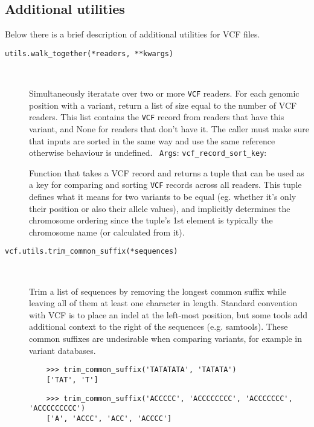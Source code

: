 \subsection{Additional utilities}

\noindent Below there is a brief description of additional utilities for VCF files.


\begin{description}

    \item[\texttt{utils.walk\_together(*readers, **kwargs)}] \

    Simultaneously iteratate over two or more \verb|VCF| readers. For each genomic position with a variant,
    return a list of size equal to the number of VCF readers. This list contains the \verb|VCF| record from
    readers that have this variant, and None for readers that don’t have it. The caller must make sure
    that inputs are sorted in the same way and use the same reference otherwise behaviour is undefined.
    \
    \verb|Args|:
            \verb|vcf_record_sort_key|: \

    Function that takes a VCF record and returns a
    tuple that can be used as a key for comparing and sorting \verb|VCF| records across all readers.
    This tuple defines what it means for two variants to be equal (eg. whether it’s only their
    position or also their allele values), and implicitly determines the chromosome ordering since
    the tuple’s 1st element is typically the chromosome name (or calculated from it).


    \item[\texttt{vcf.utils.trim\_common\_suffix(*sequences)}] \

    Trim a list of sequences by removing the longest common suffix while leaving all of them at least one
    character in length. Standard convention with VCF is to place an indel at the left-most position,
    but some tools add additional context to the right of the sequences (e.g. samtools).
    These common suffixes are undesirable when comparing variants, for example in variant databases.

    \begin{verbatim}
    >>> trim_common_suffix('TATATATA', 'TATATA')
    ['TAT', 'T']
    \end{verbatim}

    \begin{verbatim}
    >>> trim_common_suffix('ACCCCC', 'ACCCCCCCC', 'ACCCCCCC', 'ACCCCCCCCC')
    ['A', 'ACCC', 'ACC', 'ACCCC']
    \end{verbatim}

   
    \end{description}

